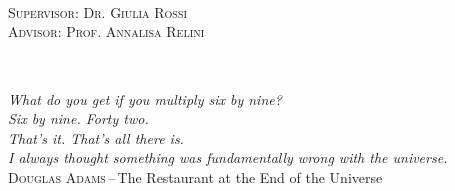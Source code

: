 \documentclass[a4paper,11pt,cleardoubleempty,abstracton]{scrbook}
\numberwithin{equation}{section}
\begin{document}
\pagestyle{empty}
\clearscrheadfoot
\frontmatter

%
\begin{titlepage}
\begin{center}
	~\\[3cm]
    \\\bigskip
     \\
\end{center}
\vfill
\noindent
\textsc{\sffamily Supervisor: Dr. Giulia Rossi}
~\\[0.5cm]
\textsc{\sffamily Advisor: Prof. Annalisa Relini}%
\end{titlepage}
\restoregeometry

\clearpage
~\\[3cm]
\begin{flushright}\footnotesize
	\textsl{What do you get if you multiply six by nine?}\\
	\textsl{Six by nine. Forty two.}\\
	\textsl{That's it. That's all there is.}\\
	\textsl{I always thought something was fundamentally wrong with the universe.}\\\medskip
	\textsc{\sffamily Douglas Adams}\,--\,\textsf{The Restaurant at the End of the Universe}
\end{flushright}
\vfill





\tableofcontents


\clearscrheadfoot
\pagestyle{scrheadings}

\rohead{\rightmark}
\lehead{\leftmark}

\renewcommand{\sectionmark}[1]{\markright{\spacedlowsmallcaps{\textcolor{gray}{\thesection\ #1}}\normalfont\qquad\pagemark{}}}
\renewcommand{\chaptermark}[1]{\markleft{\normalfont\pagemark{}\qquad\spacedlowsmallcaps{\textcolor{gray}{\thechapter\ #1}}\normalfont}}
\end{document}

